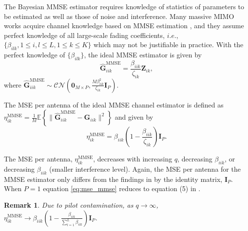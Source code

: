 \documentclass[10pt,journal,comsoc,final]{IEEEtran}
\newtheorem{remark}{Remark}
\begin{document}
The Bayesian MMSE estimator requires knowledge of statistics of parameters to be estimated as well as those of noise and interference. Many massive MIMO works acquire channel knowledge based on MMSE estimation \cite{marzetta:pilotContamination, Marzetta:finitedimensionalchannels}, and they assume perfect knowledge of all large-scale fading coefficients, $i.e.$, $\{\beta_{ilk}, 1 \leq i, l \leq L, 1 \leq k \leq K\}$ which may not be justifiable in practice. With the perfect knowledge of $\{\beta_{ilk}\}$, the ideal MMSE estimator is given by \cite{kay:estimationbook}
\begin{equation}\label{eq:mmse}
\hat{\textbf{G}}_{iik}^{\text{MMSE}} = \frac{\beta_{iik}}{\zeta_{ik}}\textbf{Z}_{ik},
\end{equation}
where $\hat{\textbf{G}}_{iik}^{\text{MMSE}} \sim \mathcal{CN}(\textbf{0}_{M \times P},\frac{M \beta_{iik}^{2}}{\zeta_{ik}}\textbf{I}_{P})$.

The MSE per antenna of the ideal MMSE channel estimator is defined as $\eta_{ik}^{\text{MMSE}} = \frac{1}{M} \mathbb{E} \left\lbrace \lVert  \hat{\textbf{G}}_{iik}^{\text{MMSE}} - \textbf{G}_{iik} \rVert^{2} \right\rbrace$ and given by \cite{kay:estimationbook}
\begin{equation}\label{eq:mse_mmse}
\eta_{ik}^{\text{MMSE}} = \beta_{iik}\left( 1 - \frac{\beta_{iik}}{\zeta_{ik}} \right) \textbf{I}_{P}.
\end{equation}

The MSE per antenna, $\eta_{ik}^{\text{MMSE}}$, decreases with increasing $q$, decreasing $\beta_{iik}$, or decreasing $\beta_{iik}$ (smaller interference level). Again, the MSE per antenna for the MMSE estimator only differs from the findings in \cite{Amin:channelEstPilotCont} by the identity matrix, $ \textbf{I}_{P}$. When $P = 1$ equation \eqref{eq:mse_mmse} reduces to equation (5) in \cite{Amin:channelEstPilotCont}.

\begin{remark} Due to pilot contamination, as $q \to\infty$, $\eta_{ik}^{\text{MMSE}} \to \beta_{iik} \left( 1 - \frac{\beta_{iik}}{\sum_{l=1}^{L}{\beta_{ilk}}} \right) \textbf{I}_{P}$. \end{remark}
\end{document}
